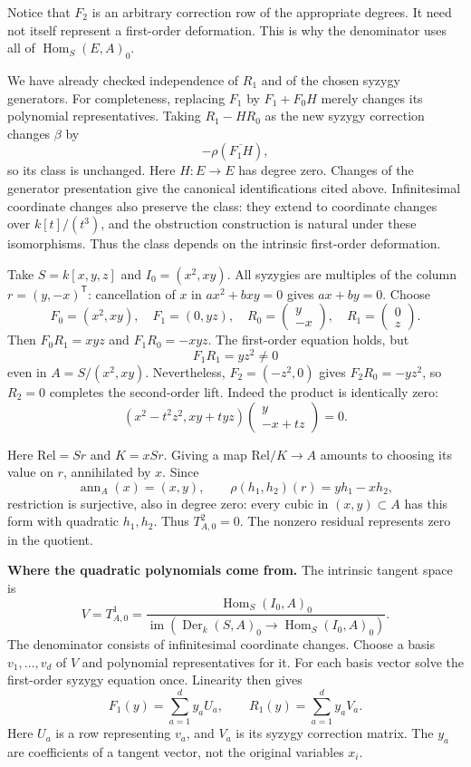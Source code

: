 Notice that $F_2$ is an arbitrary correction
row of the appropriate degrees. It need
not itself represent a first-order
deformation. This is why the denominator
uses all of $\operatorname{Hom}_S(E,A)_0$.

We have already checked independence of
$R_1$ and of the chosen syzygy generators.
For completeness, replacing $F_1$ by
$F_1+F_0H$ merely changes its polynomial
representatives. Taking $R_1-HR_0$ as the
new syzygy correction changes $\beta$ by
$$
-\rho(\overline{F_1H}),
$$
so its class is unchanged. Here $H:E\to E$
has degree zero. Changes of the generator
presentation give the canonical
identifications cited above. Infinitesimal
coordinate changes also preserve the class:
they extend to coordinate changes over
$k[t]/(t^3)$, and the obstruction
construction is natural under these
isomorphisms. Thus the class depends on the
intrinsic first-order deformation.

\begin{example}
\label{example-removing-residual}
Take $S=k[x,y,z]$ and $I_0=(x^2,xy)$.
All syzygies are multiples of the column
$r=(y,-x)^{\mathsf{T}}$: cancellation of
$x$ in $ax^2+bxy=0$ gives $ax+by=0$.
Choose
$$
F_0=(x^2,xy),\quad F_1=(0,yz),\quad
R_0=\begin{pmatrix}y\\-x\end{pmatrix},
\quad R_1=\begin{pmatrix}0\\z\end{pmatrix}.
$$
Then $F_0R_1=xyz$ and $F_1R_0=-xyz$.
The first-order equation holds, but
$$
F_1R_1=yz^2\neq0
$$
even in $A=S/(x^2,xy)$. Nevertheless,
$F_2=(-z^2,0)$ gives $F_2R_0=-yz^2$,
so $R_2=0$ completes the second-order lift.
Indeed the product is identically zero:
$$
(x^2-t^2z^2,xy+tyz)
\begin{pmatrix}y\\-x+tz\end{pmatrix}=0.
$$

Here $\mathrm{Rel}=Sr$ and $K=xSr$.
Giving a map $\mathrm{Rel}/K\to A$ amounts
to choosing its value on $r$, annihilated
by $x$. Since
$$
\operatorname{ann}_A(x)=(x,y),\qquad
\rho(h_1,h_2)(r)=yh_1-xh_2,
$$
restriction is surjective, also in degree
zero: every cubic in $(x,y)\subset A$ has
this form with quadratic $h_1,h_2$.
Thus $T^2_{A,0}=0$. The nonzero residual
represents zero in the quotient.
\end{example}

\medskip\noindent
\textbf{Where the quadratic polynomials
come from.}
The intrinsic tangent space is
$$
V=T^1_{A,0}=
\frac{\operatorname{Hom}_S(I_0,A)_0}
{\operatorname{im}
(\operatorname{Der}_k(S,A)_0
\to\operatorname{Hom}_S(I_0,A)_0)}.
$$
The denominator consists of infinitesimal
coordinate changes. Choose a basis
$v_1,\ldots,v_d$ of $V$ and polynomial
representatives for it. For each basis
vector solve the first-order syzygy
equation once. Linearity then gives
$$
F_1(y)=\sum_{a=1}^d y_a U_a,\qquad
R_1(y)=\sum_{a=1}^d y_a V_a.
$$
Here $U_a$ is a row representing $v_a$,
and $V_a$ is its syzygy correction matrix.
The $y_a$ are coefficients of a tangent
vector, not the original variables $x_i$.

